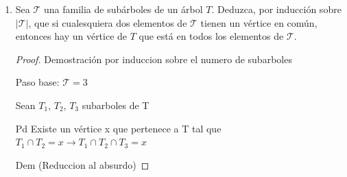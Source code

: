 \documentclass{article}
\begin{document}
\begin{enumerate}
\begin{proof}
\begin{itemize}
\begin{itemize}
                        \item[$\cdot$)] Supongamos que $K_{k + 1}$ es subgr\'afica inducida de $G$,
                        entonces hay $1$ vértice de $K_{k + 1}$ en cada una de las partes (lo que
                        suma $k$ v\'ertices) y un $x \in K_{k + 1}$ en alguna parte tal que se
                        relaciona con exactamente un v\'ertice en esa parte y por tanto, $G$ no
                        es $k$-partita completa!! (no cumple el ser $k$-partita) y he aquí una
                        contradicción de suponer que $K_{k + 1}$ es subgr\'afica inducida de $G$.
                        Por lo tanto, concluimos que $K_{k + 1}$ no es subgr\'afica inducida de $G$.
                    \end{itemize}

                \item[$\Leftarrow$)]
            \end{itemize}
            De los casos anterior concluimos que $G$ es $k$-partita completa si y
            s\'olo si no contiene a $K_{k+1}$ ni a $\overline{P_3}$ como subgr\'aficas
            inducidas.
        \end{proof}

    $$\text{\textbf{\large Ejercicio de la Tarea 4}}$$

   \item {}

        Sea $\mathcal{T}$ una familia de sub\'arboles
        de un \'arbol $T$.   Deduzca, por inducci\'on sobre
        $|\mathcal{T}|$, que si cualesquiera dos elementos
        de $\mathcal{T}$ tienen un v\'ertice en com\'un,
        entonces hay un v\'ertice de $T$ que est\'a en
        todos los elementos de $\mathcal{T}$.

        \begin{proof}
            Demostración por induccion sobre el numero de subarboles

            Paso base: $\mathcal{T} = 3$

            Sean $T_1$, $T_2$, $T_3$ subarboles de T

            Pd Existe  un vértice x que pertenece a T tal que $T_1 \cap T_2=x \rightarrow  T_1 \cap T_2 \cap T_3 = x$

            Dem (Reduccion al absurdo)


\end{proof}
\end{enumerate}
\end{document}
